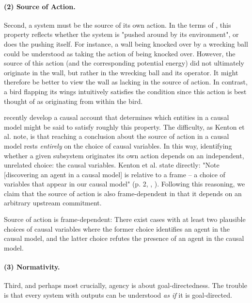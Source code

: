 \documentclass[11pt]{article} %
\begin{document}
%
\paragraph{(2) Source of Action.} Second, a system must be the source of its own action. In the terms of \cite{ball2023organisms}, this property reflects whether the system is "pushed around by its environment", or does the pushing itself. 
%
For instance, a wall being knocked over by a wrecking ball could be understood as taking the action of being knocked over. However, the source of this action (and the corresponding potential energy) did not ultimately originate in the wall, but rather in the wrecking ball and its operator. It might therefore be better to view the wall as lacking in the source of action. In contrast, a bird flapping its wings intuitively satisfies the condition since this action is best thought of as originating from within the bird. 

%
\cite{kenton2023discovering} recently develop a causal account that determines which entities in a causal model might be said to satisfy roughly this property. The difficulty, as Kenton et al. note, is that reaching a conclusion about the source of action in a causal model rests \textit{entirely} on the choice of causal variables. In this way, identifying whether a given subsystem originates its own action depends on an independent, unrelated choice: the causal variables. Kenton et al. state directly: "Note [discovering an agent in a causal model] is relative to a frame -- a choice of variables that appear in our causal model" (p. 2, \citeauthor{kenton2023discovering}, \citeyear{kenton2023discovering}). Following this reasoning, we claim that the source of action is also frame-dependent in that it depends on an arbitrary upstream commitment. %

%
\begin{claim}
Source of action is frame-dependent: There exist cases with at least two plausible choices of causal variables where the former choice identifies an agent in the causal model, and the latter choice refutes the presence of an agent in the causal model.
\end{claim}


%
\paragraph{(3) Normativity.} Third, and perhaps most crucially, agency is about goal-directedness. The trouble is that every system with outputs can be understood \textit{as if} \citep{friedman1953essays} it is goal-directed. %
\end{document}
